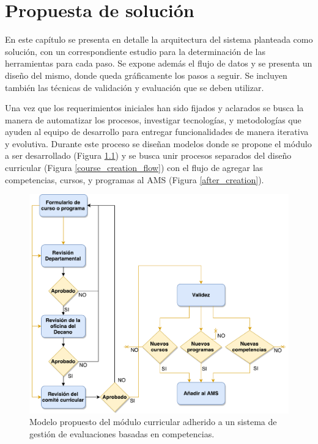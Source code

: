 \chapter{Propuesta de solución} %
\label{capitulo4} %
En este capítulo se presenta en detalle la arquitectura del sistema planteada como solución, con un correspondiente estudio para la determinación de las herramientas para cada paso. Se expone además el flujo de datos y se presenta un diseño del mismo, donde queda gráficamente los pasos a seguir. Se incluyen también las técnicas de validación y evaluación que se deben utilizar.

Una vez que los requerimientos iniciales han sido fijados y aclarados se busca la manera de automatizar los procesos, investigar tecnologías, y metodologías que ayuden al equipo de desarrollo para entregar funcionalidades de manera iterativa y evolutiva. Durante este proceso se diseñan modelos donde se propone el módulo a ser desarrollado (Figura \ref{curriculum_model}) y se busca unir procesos separados del diseño curricular (Figura \ref{course_creation_flow}) con el flujo de agregar las competencias, cursos, y programas al AMS (Figura \ref{after_creation}).

\begin{figure}[]
\centering
\includegraphics[scale=0.5]{Capitulos/PropuestadeSolucion/Imagenes/curriculum_model}
\caption{Modelo propuesto del módulo curricular adherido a un sistema de gestión de evaluaciones basadas en competencias.}
  \label{curriculum_model}
\end{figure}

